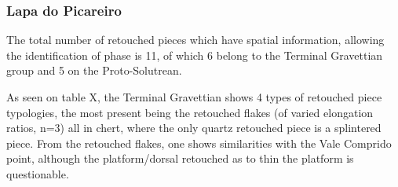 \documentclass[12pt,twoside]{reedthesis}
\begin{document}
\hypertarget{lapa-do-picareiro-4}{%
\subsubsection{Lapa do Picareiro}\label{lapa-do-picareiro-4}}

The total number of retouched pieces which have spatial information, allowing the identification of phase is 11, of which 6 belong to the Terminal Gravettian group and 5 on the Proto-Solutrean.

As seen on table X, the Terminal Gravettian shows 4 types of retouched piece typologies, the most present being the retouched flakes (of varied elongation ratios, n=3) all in chert, where the only quartz retouched piece is a splintered piece. From the retouched flakes, one shows similarities with the Vale Comprido point, although the platform/dorsal retouched as to thin the platform is questionable.
\end{document}
